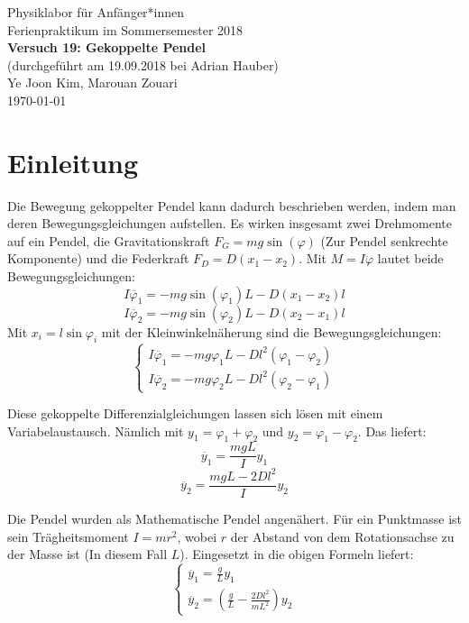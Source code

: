 \documentclass[11pt,a4paper]{article}
\begin{document}
{
	\centering 
	\large 
	Physiklabor für Anfänger*innen \\
	Ferienpraktikum im Sommersemester 2018 \\[4mm]
	\textbf{\LARGE 
		Versuch 19: Gekoppelte Pendel
	} \\[3mm]
	(durchgeführt am 19.09.2018 bei Adrian Hauber) \\
	Ye Joon Kim, Marouan Zouari\\
	\today \\[10mm]
}
\tableofcontents
\newpage
\section{Einleitung}
Die Bewegung gekoppelter Pendel kann dadurch beschrieben werden, indem man deren Bewegungsgleichungen aufstellen. Es wirken insgesamt zwei Drehmomente auf ein Pendel, die Gravitationskraft $F_G = mg\sin(\varphi)$ (Zur Pendel senkrechte Komponente) und die Federkraft $F_D = D(x_1 - x_2)$. Mit $M = I\ddot{\varphi}$ lautet beide Bewegungsgleichungen:
$$ I \ddot{\varphi_1} = -mg\sin(\varphi_1)L - D(x_1-x_2)l$$
$$I \ddot{\varphi_2} = -mg\sin(\varphi_2)L - D(x_2-x_1)l$$
Mit $x_i = l\sin{\varphi_i}$ mit der Kleinwinkelnäherung sind die Bewegungsgleichungen:
\begin{equation}
\left\{
\begin{array}{c}
I\ddot{\varphi_1}=-mg\varphi_1L - Dl^2(\varphi_1-\varphi_2)
\\
I\ddot{\varphi_2}=-mg\varphi_2L - Dl^2(\varphi_2-\varphi_1)
\end{array}
\right.
\end{equation}

Diese gekoppelte Differenzialgleichungen lassen sich lösen mit einem Variabelaustausch. Nämlich mit $y_1 = \varphi_1 + \varphi_2$ und $y_2 = \varphi_1 - \varphi_2$. Das liefert:
$$\ddot{y_1} = \frac{mgL}{I}y_1$$
$$\ddot{y_2} = \frac{mgL-2Dl^2}{I}y_2$$

Die Pendel wurden als Mathematische Pendel angenähert. Für ein Punktmasse ist sein Trägheitsmoment $I = mr^2$, wobei $r$ der Abstand von dem Rotationsachse zu der Masse ist (In diesem Fall $L$). Eingesetzt in die obigen Formeln liefert:
\begin{equation}
\left\{
\begin{array}{c}
\ddot{y_1} = \frac{g}{L}y_1
\\
\ddot{y_2} = (\frac{g}{L}-\frac{2Dl^2}{mL^2})y_2
\end{array}
\right.
\end{equation}
\end{document}
